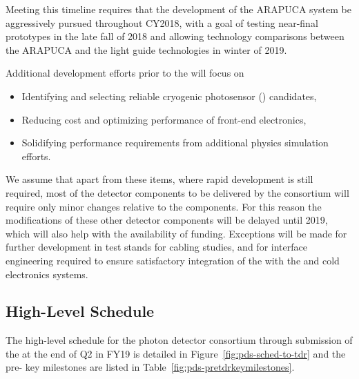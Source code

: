Meeting this timeline requires that the development of the ARAPUCA system be aggressively pursued throughout CY2018, with a goal of testing near-final prototypes in the late fall of \num{2018} and allowing technology comparisons between the ARAPUCA and the light guide technologies in winter of \num{2019}.

Additional development efforts prior to the  will focus on

\begin{itemize}
\item Identifying and selecting reliable cryogenic photosensor () candidates,
\item Reducing cost and optimizing performance of front-end electronics,
\item Solidifying  performance requirements from additional physics simulation efforts.
\end{itemize}

We assume that apart from these items, where rapid development is still required, most of the detector components to be delivered by the  consortium will require only minor changes relative to the  components. For this reason the modifications of these other detector components will be delayed until \num{2019}, which will also help with the availability of funding. Exceptions will be made for further development in test stands for cabling studies, and for interface engineering required to ensure satisfactory integration of the  with the  and cold electronics systems.


\subsection{High-Level Schedule}
\label{sec:fdsp-pd-org-cs}

The high-level schedule for the photon detector consortium through submission of the  at the end of Q2 in FY19 is detailed in Figure~\ref{fig:pds-sched-to-tdr} and the pre- key milestones are listed in Table~\ref{fig:pds-pretdrkeymilestones}.

